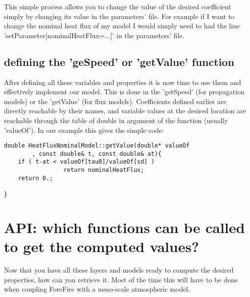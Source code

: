 This simple process allows you to change the value of the desired coefficient simply by changing its value in the parameters' file. For example if I want to change the nominal heat flux of my model I would simply need to had the line 'setParameter[nominalHeatFlux=...]' in the parameters' file.

\section{defining the 'geSpeed' or 'getValue' function}

After defining all these variables and properties it is now time to use them and effectively implement our model. This is done in the 'getSpeed' (for propagation models) or the 'getValue' (for flux models). Coefficients defined earlier are directly reachable by their names, and variable values at the desired location are reachable through the table of double in argument of the function (usually 'valueOf'). In our example this gives the simple code:
\begin{lstlisting}[caption={the getValue for the 'HeatFluxNominal' model},frame=single]
double HeatFluxNominalModel::getValue(double* valueOf
		, const double& t, const double& at){
	if ( t-at < valueOf[tau0]/valueOf[sd] ) 
	             return nominalHeatFlux;
	return 0.;

}
\end{lstlisting}


\chapter{API: which functions can be called to get the computed values?}
\label{sec:api}

Now that you have all these layers and models ready to compute the desired properties, how can you retrieve it. Most of the time this will have to be done when coupling ForeFire with a meso-scale atmospheric model. 

